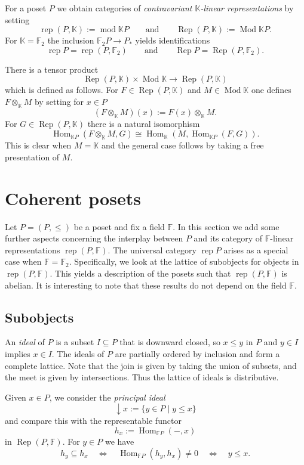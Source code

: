 \documentclass[a4paper]{amsart}
\theoremstyle{plain}
\theoremstyle{definition}
\theoremstyle{remark}
\numberwithin{equation}{section}
\newcommand{\Hom}{\operatorname{Hom}}
\renewcommand{\mod}{\operatorname{mod}}
\newcommand{\Mod}{\operatorname{Mod}}
\newcommand{\rep}{\operatorname{rep}}
\newcommand{\Rep}{\operatorname{Rep}}
\newcommand{\lto}{\longrightarrow}
\def\bbF{\mathbb F}
\def\bbK{\mathbb K}
\begin{document}
For a poset $P$  we obtain categories of \emph{contravariant $\bbK$-linear representations}
by setting
\[\rep(P,\bbK):=\mod \bbK P\qquad\text{and}\qquad
  \Rep(P,\bbK):=\Mod\bbK P.\]
For $\bbK=\bbF_2$ the inclusion $\bbF_2 P\to P_*$ yields identifications
\[\rep P =\rep(P,\bbF_2)\qquad\text{and}\qquad
  \Rep P=\Rep(P,\bbF_2).\]

There is a tensor product
\[\Rep(P,\bbK)\times\Mod\bbK\lto \Rep(P,\bbK)\]
which is defined as follows. For $F\in\Rep(P,\bbK)$ and $M\in\Mod\bbK$
one defines $F\otimes_\bbK M$ by setting for $x\in P$
\[(F\otimes_\bbK M)(x):= F(x)\otimes_\bbK M.\]
For  $G\in\Rep(P,\bbK)$ there is a natural isomorphism
\begin{equation}\label{eq:tensor}
  \Hom_{\bbK P}(F\otimes_\bbK M,G)\cong\Hom_{\bbK}(M,\Hom_{\bbK
    P}(F,G)).
\end{equation}
This is clear when  $M=\bbK$ and the
general case follows by taking a free presentation of $M$.

\section{Coherent posets}

Let $P=(P,\le)$ be a poset and fix a field $\bbF$. In this section we
add some further aspects concerning the interplay between $P$ and its
category of $\bbF$-linear representations $\rep(P,\bbF)$. The
universal category $\rep P$ arises as a special case when
$\bbF=\bbF_2$. Specifically, we look at the lattice of subobjects for
objects in $\rep(P,\bbF)$.  This yields a description of the posets
such that $\rep(P,\bbF)$ is abelian. It is interesting to note that
these results do not depend on the field $\bbF$.

\subsection*{Subobjects}
An \emph{ideal} of $P$ is a subset $I\subseteq P$ that is downward
closed, so $x\le y$ in $P$ and $y\in I$ implies $x\in I$. The ideals
of $P$ are partially ordered by inclusion and form a complete
lattice. Note that the join is given by taking the union of subsets,
and the meet is given by intersections. Thus the lattice of ideals is distributive.

Given $x\in P$, we consider the
\emph{principal ideal}
\[\downarrow\! x:=\{y\in P\mid y\le x\}\]
and compare this with the representable functor
\[h_x:=\Hom_{\bbF P}(-,x)\] in $\Rep(P,\bbF)$.  For $y\in P$ we have
\[h_y\subseteq h_x\quad\iff\quad\Hom_{\bbF P}(h_y,h_x)\neq
  0\quad\iff\quad y\le x.\]
\end{document}
